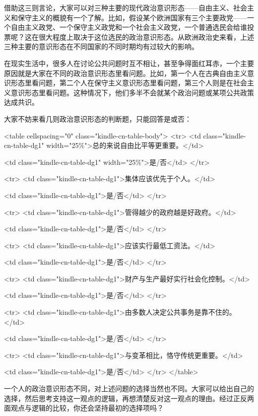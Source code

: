 借助这三则言论，大家可以对三种主要的现代政治意识形态——自由主义、社会主义和保守主义的概貌有一个了解。比如，假设某个欧洲国家有三个主要政党——一个自由主义政党、一个保守主义政党和一个社会主义政党，一个普通选民会给谁投票呢？这在很大程度上取决于这位选民的政治意识形态。从欧洲政治史来看，上述三种主要的意识形态在不同国家的不同时期均有过较大的影响。

在现实生活中，很多人在讨论公共问题时互不相让，甚至争得面红耳赤，一个主要原因就是大家在不同的政治意识形态里看问题。比如，第一个人在古典自由主义意识形态里看问题，第二个人在保守主义意识形态里看问题，第三个人则是在社会主义意识形态里看问题。这种情况下，他们多半不会就某个政治问题或某项公共政策达成共识。

大家不妨来看几则政治意识形态的判断题，只能回答是或否：

<table cellspacing="0" class="kindle-cn-table-body">
 <tr>
 <td class="kindle-cn-table-dg1" width="25\%">总的来说自由比平等更重要。</td>

 <td class="kindle-cn-table-dg1" width="25\%">是/否</td>
</tr>

 <tr>
 <td class="kindle-cn-table-dg1">集体应该优先于个人。</td>

 <td class="kindle-cn-table-dg1">是/否</td>
</tr>

 <tr>
 <td class="kindle-cn-table-dg1">管得越少的政府越是好政府。</td>

 <td class="kindle-cn-table-dg1">是/否</td>
</tr>

 <tr>
 <td class="kindle-cn-table-dg1">应该实行最低工资法。</td>

 <td class="kindle-cn-table-dg1">是/否</td>
</tr>

 <tr>
 <td class="kindle-cn-table-dg1">财产与生产最好实行社会化控制。</td>

 <td class="kindle-cn-table-dg1">是/否</td>
</tr>

 <tr>
 <td class="kindle-cn-table-dg1">由多数人决定公共事务是靠不住的。</td>

 <td class="kindle-cn-table-dg1">是/否</td>
</tr>

 <tr>
 <td class="kindle-cn-table-dg1">与变革相比，恪守传统更重要。</td>

 <td class="kindle-cn-table-dg1">是/否</td>
</tr>
</table>

一个人的政治意识形态不同，对上述问题的选择当然也不同。大家可以给出自己的选择，然后思考支持这一观点的逻辑，再想清楚反对这一观点的理由。经过正反两面观点与逻辑的比较，你还会坚持最初的选择项吗？


